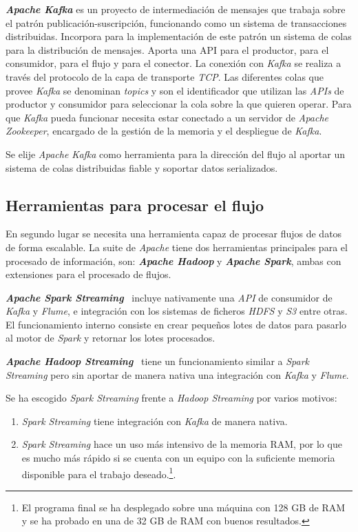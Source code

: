\textit{\textbf{Apache Kafka}} es un proyecto de intermediación de mensajes que trabaja sobre el patrón publicación-suscripción, funcionando como un sistema de transacciones distribuidas. Incorpora para la implementación de este patrón un sistema de colas para la distribución de mensajes. Aporta una API para el productor, para el consumidor, para el flujo y para el conector. La conexión con \textit{Kafka} se realiza a través del protocolo de la capa de transporte \textit{TCP}. Las diferentes colas que provee \textit{Kafka} se denominan \textit{topics} y son el identificador que utilizan las \textit{APIs} de productor y consumidor para seleccionar la cola sobre la que quieren operar. Para que \textit{Kafka} pueda funcionar necesita estar conectado a un servidor de \textit{Apache Zookeeper}, encargado de la gestión de la memoria y el despliegue de \textit{Kafka}.

Se elije \textit{Apache Kafka} como herramienta para la dirección del flujo al aportar un sistema de colas distribuidas fiable y soportar datos serializados.

\subsection{Herramientas para procesar el flujo}
En segundo lugar se necesita una herramienta capaz de procesar flujos de datos de forma escalable. La suite de \textit{Apache} tiene dos herramientas principales para el procesado de información, son: \textit{\textbf{Apache Hadoop}} y \textit{\textbf{Apache Spark}}, ambas con extensiones para el procesado de flujos.

\textit{\textbf{Apache Spark Streaming}}~\cite{noauthorsparknodate} incluye nativamente una \textit{API} de consumidor de \textit{Kafka} y \textit{Flume}, e integración con los sistemas de ficheros \textit{HDFS} y \textit{S3} entre otras. El funcionamiento interno consiste en crear pequeños lotes de datos para pasarlo al motor de \textit{Spark} y retornar los lotes procesados.

\textit{\textbf{Apache Hadoop Streaming}}~\cite{noauthorhadoop} tiene un funcionamiento similar a \textit{Spark Streaming} pero sin aportar de manera nativa una integración con \textit{Kafka} y \textit{Flume}.

Se ha escogido \textit{Spark Streaming} frente a \textit{Hadoop Streaming} por varios motivos:
\begin{enumerate}
	\item \textit{Spark Streaming} tiene integración con \textit{Kafka} de manera nativa.
	\item \textit{Spark Streaming} hace un uso más intensivo de la memoria RAM, por lo que es mucho más rápido si se cuenta con un equipo con la suficiente memoria disponible para el trabajo deseado.\footnote{El programa final se ha desplegado sobre una máquina con 128 GB de RAM y se ha probado en una de 32 GB de RAM con buenos resultados.}.
\end{enumerate}



